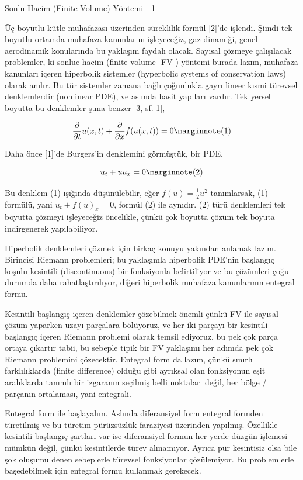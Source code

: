 \documentclass[12pt,fleqn]{article}\usepackage{../../common}
\begin{document}
Sonlu Hacim (Finite Volume) Yöntemi - 1

Üç boyutlu kütle muhafazası üzerinden süreklilik formül [2]'de işlendi.  Şimdi
tek boyutlu ortamda muhafaza kanunlarını işleyeceğiz, gaz dinamiği, genel
aerodinamik konularında bu yaklaşım faydalı olacak. Sayısal çözmeye çalışılacak
problemler, ki sonluc hacim (finite volume -FV-) yöntemi burada lazım, muhafaza
kanunları içeren hiperbolik sistemler (hyperbolic systems of conservation laws)
olarak anılır. Bu tür sistemler zamana bağlı çoğunlukla gayrı lineer kısmi
türevsel denklemlerdir (nonlinear PDE), ve aslında basit yapıları vardır. Tek
yersel boyutta bu denklemler şuna benzer [3, sf. 1],

$$
\frac{\partial }{\partial t} u(x,t) + 
\frac{\partial }{\partial x} f(u(x,t)) = 0
\mlabel{1}
$$

Daha önce [1]'de Burgers'in denklemini görmüştük, bir PDE,

$$
u_t + uu_x = 0
\mlabel{2}
$$

Bu denklem (1) ışığında düşünülebilir, eğer $f(u) = \frac{1}{2}u^2$ tanımlarsak,
(1) formülü, yani $u_t + f(u)_x = 0$, formül (2) ile aynıdır. (2) türü
denklemleri tek boyutta çözmeyi işleyeceğiz öncelikle, çünkü çok boyutta çözüm
tek boyuta indirgenerek yapılabiliyor.

Hiperbolik denklemleri çözmek için birkaç konuyu yakından anlamak
lazım. Birincisi Riemann problemleri; bu yaklaşımla hiperbolik PDE'nin başlangıç
koşulu kesintili (discontinuous) bir fonksiyonla belirtiliyor ve bu çözümleri
çoğu durumda daha rahatlaştırılıyor, diğeri hiperbolik muhafaza kanunlarının
entegral formu.

Kesintili başlangıç içeren denklemler çözebilmek önemli çünkü FV ile sayısal
çözüm yaparken uzayı parçalara bölüyoruz, ve her iki parçayı bir kesintili
başlangıç içeren Riemann problemi olarak temsil ediyoruz, bu pek çok parça
ortaya çıkartır tabii, bu sebeple tipik bir FV yaklaşımı her adımda pek çok
Riemann problemini çözecektir. Entegral form da lazım, çünkü sınırlı
farklılıklarda (finite difference) olduğu gibi ayrıksal olan fonksiyonun eşit
aralıklarda tanımlı bir izgaranın seçilmiş belli noktaları değil, her bölge /
parçanın ortalaması, yani entegrali.

Entegral form ile başlayalım. Aslında diferansiyel form entegral formden
türetilmiş ve bu türetim pürüzsüzlük faraziyesi üzerinden yapılmış. Özellikle
kesintili başlangıç şartları var ise diferansiyel formun her yerde düzgün
işlemesi mümkün değil, çünkü kesintilerde türev alınamıyor. Ayrıca pür
kesintisiz olsa bile şok oluşumu denen sebeplerle türevsel fonksiyonlar
çözülemiyor. Bu problemlerle başedebilmek için entegral formu kullanmak
gerekecek.
\end{document}
